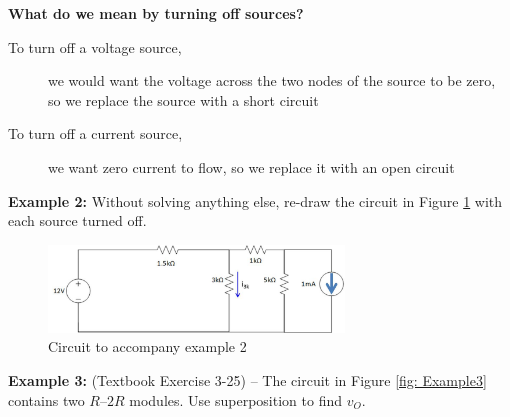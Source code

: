 \documentclass{handout}
\begin{document}
\textbf{What do we mean by turning off sources?}
\begin{description}
\item[To turn off a voltage source,] we would want the voltage across the two nodes of the source to be zero, so we replace the source with a short circuit
\item[To turn off a current source,] we want zero current to flow, so we replace it with an open circuit
\end{description}

\textbf{Example 2:} Without solving anything else, re-draw the circuit in Figure \ref{fig: Example2} with each source turned off.
\begin{figure} [h t b]
\centering
\includegraphics[width=0.7\textwidth]{Example2.jpg}
\caption{Circuit to accompany example 2}
\label{fig: Example2}
\end{figure}


\newpage
\clearpage
\pagebreak

\textbf{Example 3:} (Textbook Exercise 3-25) -- The circuit in Figure \ref{fig: Example3} contains two $R$--$2R$ modules.  Use superposition to find $v_O$.
\end{document}
